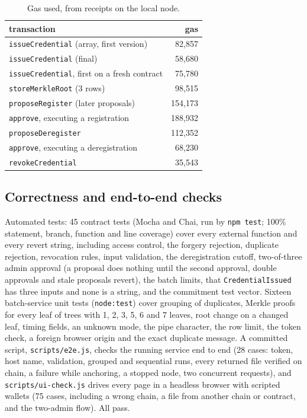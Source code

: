 \documentclass[10pt,twocolumn]{article}
\begin{document}
\begin{table}[!t]
\caption{Gas used, from receipts on the local node.}
\label{tab:gas}
\centering\footnotesize
\begin{tabular}{@{}lr@{}}
\toprule
transaction & gas\\
\midrule
\texttt{issueCredential} (array, first version) & 82{,}857\\
\texttt{issueCredential} (final) & 58{,}680\\
\texttt{issueCredential}, first on a fresh contract & 75{,}780\\
\texttt{storeMerkleRoot} (3 rows) & 98{,}515\\
\texttt{proposeRegister} (later proposals) & 154{,}173\\
\texttt{approve}, executing a registration & 188{,}932\\
\texttt{proposeDeregister} & 112{,}352\\
\texttt{approve}, executing a deregistration & 68{,}230\\
\texttt{revokeCredential} & 35{,}543\\
\bottomrule
\end{tabular}
\end{table}

\subsection{Correctness and end-to-end checks}
Automated tests: 45 contract tests (Mocha and Chai, run by \texttt{npm test}; 100\% statement, branch, function and line coverage) cover every external function and every revert string, including access control, the forgery rejection, duplicate rejection, revocation rules, input validation, the deregistration cutoff, two-of-three admin approval (a proposal does nothing until the second approval, double approvals and stale proposals revert), the batch limits, that \texttt{CredentialIssued} has three inputs and none is a string, and the commitment test vector. Sixteen batch-service unit tests (\texttt{node:test}) cover grouping of duplicates, Merkle proofs for every leaf of trees with 1, 2, 3, 5, 6 and 7 leaves, root change on a changed leaf, timing fields, an unknown mode, the pipe character, the row limit, the token check, a foreign browser origin and the exact duplicate message. A committed script, \texttt{scripts/e2e.js}, checks the running service end to end (28 cases: token, host name, validation, grouped and sequential runs, every returned file verified on chain, a failure while anchoring, a stopped node, two concurrent requests), and \texttt{scripts/ui-check.js} drives every page in a headless browser with scripted wallets (75 cases, including a wrong chain, a file from another chain or contract, and the two-admin flow). All pass.
\end{document}
